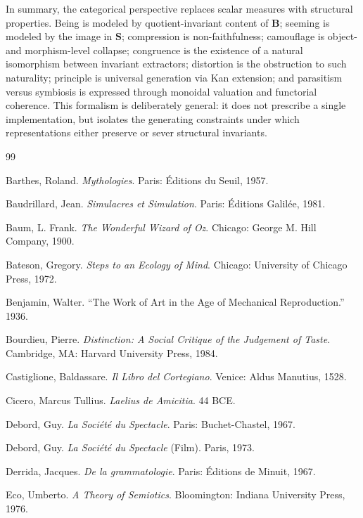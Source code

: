 \documentclass[11pt]{article}
\begin{document}
In summary, the categorical perspective replaces scalar measures with structural properties. Being is modeled by quotient-invariant content of $\mathbf{B}$; seeming is modeled by the image in $\mathbf{S}$; compression is non-faithfulness; camouflage is object- and morphism-level collapse; congruence is the existence of a natural isomorphism between invariant extractors; distortion is the obstruction to such naturality; principle is universal generation via Kan extension; and parasitism versus symbiosis is expressed through monoidal valuation and functorial coherence. This formalism is deliberately general: it does not prescribe a single implementation, but isolates the generating constraints under which representations either preserve or sever structural invariants.

\newpage
\begin{thebibliography}{99}

Barthes, Roland.
\textit{Mythologies}.
Paris: Éditions du Seuil, 1957.

Baudrillard, Jean.
\textit{Simulacres et Simulation}.
Paris: Éditions Galilée, 1981.

Baum, L. Frank.
\textit{The Wonderful Wizard of Oz}.
Chicago: George M. Hill Company, 1900.

Bateson, Gregory.
\textit{Steps to an Ecology of Mind}.
Chicago: University of Chicago Press, 1972.

Benjamin, Walter.
“The Work of Art in the Age of Mechanical Reproduction.”
1936.

Bourdieu, Pierre.
\textit{Distinction: A Social Critique of the Judgement of Taste}.
Cambridge, MA: Harvard University Press, 1984.

Castiglione, Baldassare.
\textit{Il Libro del Cortegiano}.
Venice: Aldus Manutius, 1528.

Cicero, Marcus Tullius.
\textit{Laelius de Amicitia}.
44 BCE.

Debord, Guy.
\textit{La Société du Spectacle}.
Paris: Buchet-Chastel, 1967.

Debord, Guy.
\textit{La Société du Spectacle} (Film).
Paris, 1973.

Derrida, Jacques.
\textit{De la grammatologie}.
Paris: Éditions de Minuit, 1967.

Eco, Umberto.
\textit{A Theory of Semiotics}.
Bloomington: Indiana University Press, 1976.


\end{thebibliography}
\end{document}
